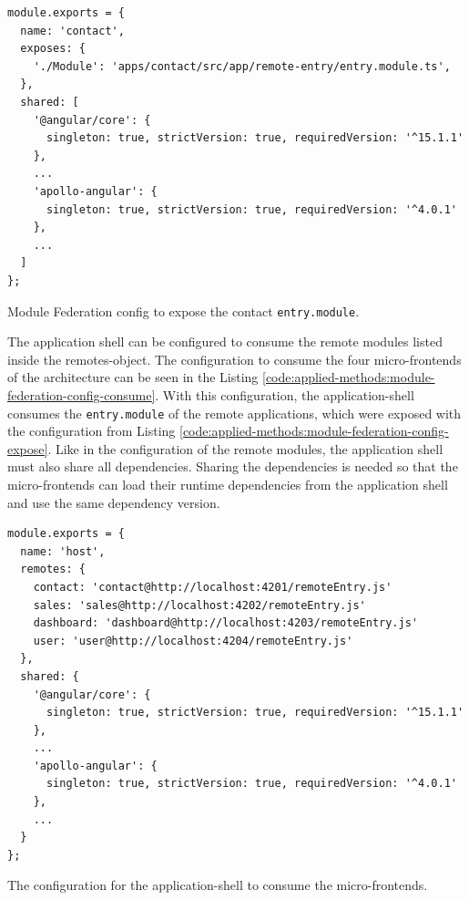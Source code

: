 \ifshowListings
\begin{listing}[H]
    \begin{verbatim}
module.exports = {
  name: 'contact',
  exposes: {
    './Module': 'apps/contact/src/app/remote-entry/entry.module.ts',
  },
  shared: [
    '@angular/core': {
      singleton: true, strictVersion: true, requiredVersion: '^15.1.1' 
    },
    ...
    'apollo-angular': { 
      singleton: true, strictVersion: true, requiredVersion: '^4.0.1' 
    },
    ...
  ]
};
    \end{verbatim}
    \caption{Module Federation config to expose the contact \texttt{entry.module}.}\label{code:applied-methods:module-federation-config-expose}
\end{listing}
\fi

\noindent The application shell can be configured to consume the remote modules listed inside the remotes-object. The configuration to consume the four micro-frontends of the architecture can be seen in the Listing \ref{code:applied-methods:module-federation-config-consume}. With this configuration, the application-shell consumes the \texttt{entry.module} of the remote applications, which were exposed with the configuration from Listing \ref{code:applied-methods:module-federation-config-expose}. Like in the configuration of the remote modules, the application shell must also share all dependencies. Sharing the dependencies is needed so that the micro-frontends can load their runtime dependencies from the application shell and use the same dependency version.

\ifshowListings
\begin{listing}[H]
    \begin{verbatim}
module.exports = {
  name: 'host',
  remotes: {
    contact: 'contact@http://localhost:4201/remoteEntry.js'
    sales: 'sales@http://localhost:4202/remoteEntry.js'
    dashboard: 'dashboard@http://localhost:4203/remoteEntry.js'
    user: 'user@http://localhost:4204/remoteEntry.js'
  },
  shared: {
    '@angular/core': {
      singleton: true, strictVersion: true, requiredVersion: '^15.1.1' 
    },
    ...
    'apollo-angular': { 
      singleton: true, strictVersion: true, requiredVersion: '^4.0.1' 
    },
    ...
  }
};
    \end{verbatim}
    \caption{The configuration for the application-shell to consume the micro-frontends.}\label{code:applied-methods:module-federation-config-consume}
\end{listing}
\fi

